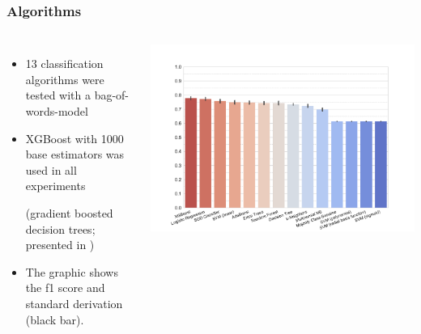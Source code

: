 \documentclass[11pt,aspectratio=169,usenames,dvipsnames]{beamer}
\begin{document}
    \begin{frame}[t]
        \frametitle{Algorithms}
        \begin{columns}[t]
            \column{2in}
            \begin{itemize}
                \item 13 classification algorithms were tested with a bag-of-words-model
              \item XGBoost with 1000 base estimators was used in all experiments
                         \begin{scriptsize}
                    (gradient boosted decision trees; presented in \cite{DBLP:journals/corr/ChenG16})
                \end{scriptsize}
                          \item  The graphic shows the f1 score and standard derivation (black bar).
            \end{itemize}
            \column{3.5in}

            \includegraphics[scale=0.35,trim={1cm 0 0 5.45cm},clip]{images/classifier.pdf}


        \end{columns}
    \end{frame}
\end{document}
